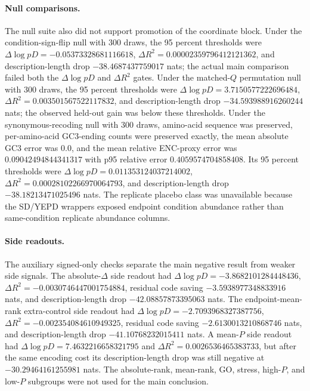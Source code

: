 \paragraph{Null comparisons.}
The null suite also did not support promotion of the coordinate block.  Under the condition-sign-flip null with $300$ draws, the 95 percent thresholds were $\Delta \log pD=-0.05373328681116618$, $\Delta R^2=0.00002359796412121362$, and description-length drop $-38.4687437759017$ nats; the actual main comparison failed both the $\Delta \log pD$ and $\Delta R^2$ gates.  Under the matched-$Q$ permutation null with $300$ draws, the 95 percent thresholds were $\Delta \log pD=3.7150577222696484$, $\Delta R^2=0.003501567522117832$, and description-length drop $-34.593988916260244$ nats; the observed held-out gain was below these thresholds.  Under the synonymous-recoding null with $300$ draws, amino-acid sequence was preserved, per-amino-acid GC3-ending counts were preserved exactly, the mean absolute GC3 error was $0.0$, and the mean relative ENC-proxy error was $0.09042494844341317$ with p95 relative error $0.4059574704858408$.  Its 95 percent thresholds were $\Delta \log pD=0.011353124037214002$, $\Delta R^2=0.00028102266970064793$, and description-length drop $-38.18213471025496$ nats.  The replicate placebo class was unavailable because the SD/YEPD wrappers exposed endpoint condition abundance rather than same-condition replicate abundance columns.

\paragraph{Side readouts.}
The auxiliary signed-only checks separate the main negative result from weaker side signals.  The absolute-$\Delta$ side readout had $\Delta \log pD=-3.8682101284448436$, $\Delta R^2=-0.0030746447001754884$, residual code saving $-3.5938977348833916$ nats, and description-length drop $-42.08857873395063$ nats.  The endpoint-mean-rank extra-control side readout had $\Delta \log pD=-2.7093968327387756$, $\Delta R^2=-0.002354084610949325$, residual code saving $-2.6130013210868746$ nats, and description-length drop $-41.10768232015411$ nats.  A mean-$P$ side readout had $\Delta \log pD=7.4632216658321795$ and $\Delta R^2=0.0026536465383733$, but after the same encoding cost its description-length drop was still negative at $-30.29464161255981$ nats.  The absolute-rank, mean-rank, GO, stress, high-$P$, and low-$P$ subgroups were not used for the main conclusion.

